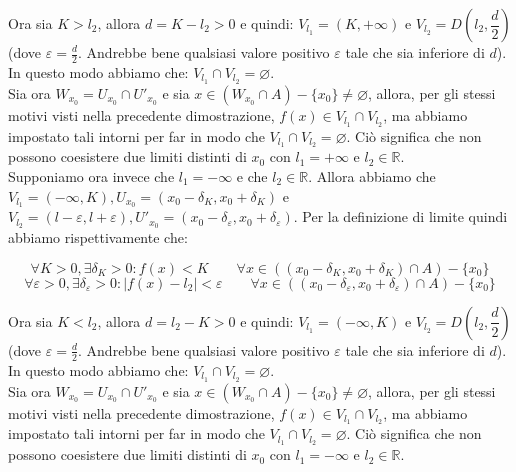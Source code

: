 \documentclass{article}
\begin{document}
\noindent Ora sia $K > l_2$, allora $d = K - l_2 > 0$ e quindi: $V_{l_1} = (K, + \infty)$ e $V_{l_2} = D\left(l_2, \dfrac{d}{2}\right)$ (dove $\varepsilon = \frac{d}{2}$. Andrebbe bene qualsiasi valore positivo $\varepsilon$ tale che sia inferiore di $d$). In questo modo abbiamo che: $V_{l_1} \cap V_{l_2} = \varnothing$.\\
Sia ora $W_{x_0} = U_{x_0} \cap U'_{x_0}$ e sia $x \in (W_{x_0} \cap A) - \{x_0\} \neq \varnothing$, allora, per gli stessi motivi visti nella precedente dimostrazione, $f(x) \in V_{l_1} \cap V_{l_2}$, ma abbiamo impostato tali intorni per far in modo che $V_{l_1} \cap V_{l_2} = \varnothing$. Ciò significa che non possono coesistere due limiti distinti di $x_0$ con $l_1 = + \infty$ e $l_2 \in \mathbb{R}$.\\

\noindent Supponiamo ora invece che $l_1 = -\infty$ e che $l_2 \in \mathbb{R}$. Allora abbiamo che $V_{l_1} = (- \infty, K), U_{x_0} = (x_0 - \delta_K, x_0 + \delta_K)$ e $V_{l_2} = (l - \varepsilon, l + \varepsilon), U'_{x_0} = (x_0 - \delta_\varepsilon, x_0 + \delta_\varepsilon)$. Per la definizione di limite quindi abbiamo rispettivamente che: 

\begin{equation*}
    \forall K > 0, \exists \delta_K > 0 : f(x) < K \qquad \forall x \in ((x_0 - \delta_K, x_0 + \delta_K) \cap A) - \{x_0\}
\end{equation*}
\begin{equation*}
    \forall \varepsilon > 0, \exists \delta_\varepsilon > 0 : |f(x) - l_2| < \varepsilon \qquad \forall x \in ((x_0 - \delta_\varepsilon, x_0 + \delta_\varepsilon) \cap A) - \{x_0\}
\end{equation*}

\noindent Ora sia $K < l_2$, allora $d = l_2 - K > 0$ e quindi: $V_{l_1} = (-\infty, K)$ e $V_{l_2} = D\left(l_2, \dfrac{d}{2}\right)$ (dove $\varepsilon = \frac{d}{2}$. Andrebbe bene qualsiasi valore positivo $\varepsilon$ tale che sia inferiore di $d$). In questo modo abbiamo che: $V_{l_1} \cap V_{l_2} = \varnothing$.\\
Sia ora $W_{x_0} = U_{x_0} \cap U'_{x_0}$ e sia $x \in (W_{x_0} \cap A) - \{x_0\} \neq \varnothing$, allora, per gli stessi motivi visti nella precedente dimostrazione, $f(x) \in V_{l_1} \cap V_{l_2}$, ma abbiamo impostato tali intorni per far in modo che $V_{l_1} \cap V_{l_2} = \varnothing$. Ciò significa che non possono coesistere due limiti distinti di $x_0$ con $l_1 = - \infty$ e $l_2 \in \mathbb{R}$.\\
\end{document}
